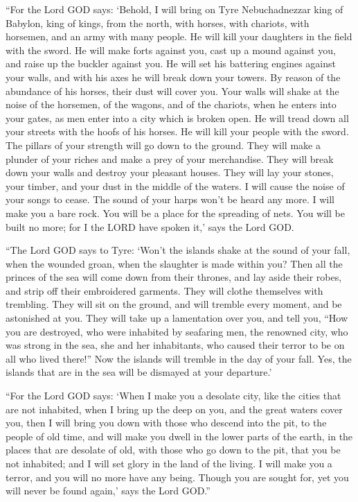  ``For the Lord GOD says: `Behold, I will bring on Tyre
Nebuchadnezzar king of Babylon, king of kings, from the north, with
horses, with chariots, with horsemen, and an army with many people.
 He will kill your daughters in the field with the sword.
He will make forts against you, cast up a mound against you, and raise
up the buckler against you.  He will set his battering
engines against your walls, and with his axes he will break down your
towers.  By reason of the abundance of his horses, their
dust will cover you. Your walls will shake at the noise of the horsemen,
of the wagons, and of the chariots, when he enters into your gates, as
men enter into a city which is broken open.  He will
tread down all your streets with the hoofs of his horses. He will kill
your people with the sword. The pillars of your strength will go down to
the ground.  They will make a plunder of your riches and
make a prey of your merchandise. They will break down your walls and
destroy your pleasant houses. They will lay your stones, your timber,
and your dust in the middle of the waters.  I will cause
the noise of your songs to cease. The sound of your harps won't be heard
any more.  I will make you a bare rock. You will be a
place for the spreading of nets. You will be built no more; for I the
LORD have spoken it,' says the Lord GOD.

 ``The Lord GOD says to Tyre: `Won't the islands shake at
the sound of your fall, when the wounded groan, when the slaughter is
made within you?  Then all the princes of the sea will
come down from their thrones, and lay aside their robes, and strip off
their embroidered garments. They will clothe themselves with trembling.
They will sit on the ground, and will tremble every moment, and be
astonished at you.  They will take up a lamentation over
you, and tell you, ``How you are destroyed, who were inhabited by
seafaring men, the renowned city, who was strong in the sea, she and her
inhabitants, who caused their terror to be on all who lived there!''
 Now the islands will tremble in the day of your fall.
Yes, the islands that are in the sea will be dismayed at your
departure.'

 ``For the Lord GOD says: `When I make you a desolate
city, like the cities that are not inhabited, when I bring up the deep
on you, and the great waters cover you,  then I will
bring you down with those who descend into the pit, to the people of old
time, and will make you dwell in the lower parts of the earth, in the
places that are desolate of old, with those who go down to the pit, that
you be not inhabited; and I will set glory in the land of the living.
 I will make you a terror, and you will no more have any
being. Though you are sought for, yet you will never be found again,'
says the Lord GOD.''

